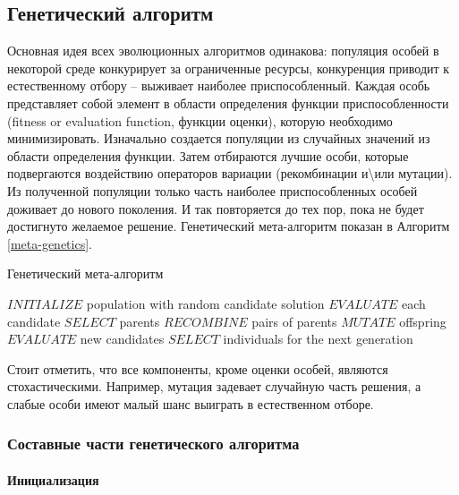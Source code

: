 \documentclass{fefu_thesis/cls/fefu}
\newenvironment{algo}[1][]
  {\begin{algorithm}[#1]
     \selectlanguage{english}
     \floatname{algorithm}{Алгоритм}
  }
  {\end{algorithm}}
\newcommand*\talgref[1]{Алгоритм \ref{#1}}
\begin{document}
    \subsection{Генетический алгоритм}

    Основная идея всех эволюционных алгоритмов одинакова: популяция особей в некоторой среде конкурирует за ограниченные ресурсы, конкуренция приводит к естественному отбору -- выживает наиболее приспособленный. Каждая особь представляет собой элемент в области определения функции приспособленности (fitness or evaluation function, функции оценки), которую необходимо минимизировать. Изначально создается популяции из случайных значений из области определения функции. Затем отбираются лучшие особи, которые подвергаются воздействию операторов вариации (рекомбинации и\textbackslash или мутации). Из полученной популяции только часть наиболее приспособленных особей доживает до нового поколения. И так повторяется до тех пор, пока не будет достигнуто желаемое решение. Генетический мета-алгоритм показан в \talgref{meta-genetics}.

    \begin{algo}[H]
        \caption{Генетический мета-алгоритм}
        \label{meta-genetics}
        \begin{algorithmic}[1]
            \State $INITIALIZE$ population with random candidate solution
            \State $EVALUATE$ each candidate
                \State $SELECT$ parents
                \State $RECOMBINE$ pairs of parents
                \State $MUTATE$ offspring
                \State $EVALUATE$ new candidates
                \State $SELECT$ individuals for the next generation
            \EndWhile
        \end{algorithmic}
    \end{algo}

    Стоит отметить, что все компоненты, кроме оценки особей, являются стохастическими. Например, мутация задевает случайную часть решения, а слабые особи имеют малый шанс выиграть в естественном отборе.

    \subsubsection{Составные части генетического алгоритма}

    \paragraph{Инициализация}
\end{document}
